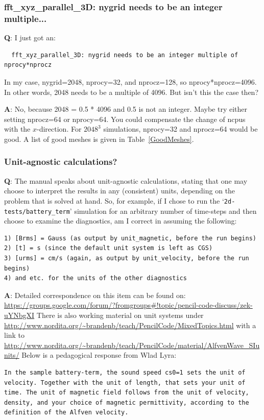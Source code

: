 \documentclass[\mydriver,12pt,twoside,notitlepage,a4paper]{article}
\makeatletter
\newcommand{\file}[2][]{%
  \def\index@{#1}%
  `\texttt{#2}'%
  \ifx\index@\@empty\index[file]{#2@\texttt{#2}}%
  \else\index[file]{#1@\texttt{#1}}%
  \fi%
}
\makeatother
\begin{document}
\subsubsection{fft\_xyz\_parallel\_3D: nygrid needs to be an integer multiple...}

{\bf Q}:
I just got an:
\begin{Verbatim}
  fft_xyz_parallel_3D: nygrid needs to be an integer multiple of nprocy*nprocz
\end{Verbatim}
In my case, nygrid=2048, nprocy=32, and nprocz=128, so nprocy*nprocz=4096.
In other words, 2048 needs to be a multiple of 4096.
But isn't this the case then?

{\bf A}:
No, because 2048 = 0.5 * 4096 and 0.5 is not an integer.
Maybe try either setting nprocz=64 or nprocy=64.
You could compensate the change of ncpus with the $x$-direction.
For $2048^3$ simulations, nprocy=32 and nprocz=64 would be good.
A list of good meshes is given in Table~\ref{GoodMeshes}.

\subsubsection{Unit-agnostic calculations?}

{\bf Q}:
The manual speaks about unit-agnostic calculations, stating that one may
choose to interpret the results in any (consistent) units, depending
on the problem that is solved at hand. So, for example, if I chose to
run the \file{2d-tests/battery_term} simulation for an arbitrary number of
time-steps and then choose to examine the diagnostics, am I correct in
assuming the following:

\begin{verbatim}
1) [Brms] = Gauss (as output by unit_magnetic, before the run begins)
2) [t] = s (since the default unit system is left as CGS)
3) [urms] = cm/s (again, as output by unit_velocity, before the run begins)
4) and etc. for the units of the other diagnostics
\end{verbatim}

{\bf A}:
Detailed correspondence on this item can be found on:
\url{https://groups.google.com/forum/?fromgroups#!topic/pencil-code-discuss/zek-uYNbgXI}
There is also working material on unit systems under
\url{http://www.nordita.org/~brandenb/teach/PencilCode/MixedTopics.html}
with a link to
\url{http://www.nordita.org/~brandenb/teach/PencilCode/material/AlfvenWave_SIunits/}
Below is a pedagogical response from Wlad Lyra:
\begin{verbatim}
In the sample battery-term, the sound speed cs0=1 sets the unit of
velocity. Together with the unit of length, that sets your unit of
time. The unit of magnetic field follows from the unit of velocity,
density, and your choice of magnetic permittivity, according to the
definition of the Alfven velocity.
\end{verbatim}
\end{document}
